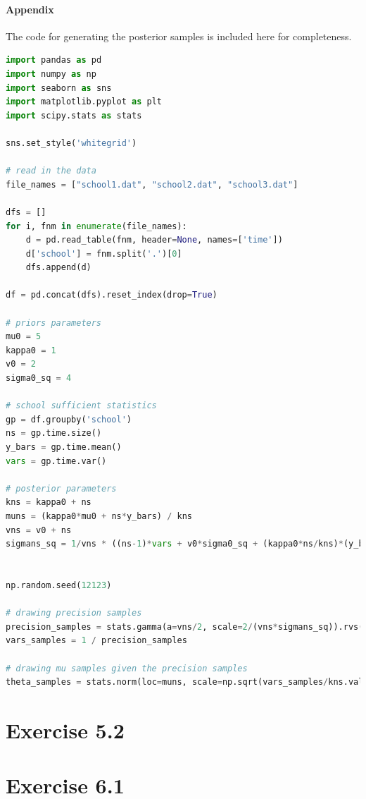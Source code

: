 \documentclass[11pt, letterpaper]{article}
\begin{document}
\paragraph{Appendix}
The code for generating the posterior samples is included here for completeness.
\begin{lstlisting}[language=Python]
import pandas as pd
import numpy as np
import seaborn as sns
import matplotlib.pyplot as plt
import scipy.stats as stats

sns.set_style('whitegrid')

# read in the data
file_names = ["school1.dat", "school2.dat", "school3.dat"]

dfs = []
for i, fnm in enumerate(file_names):
    d = pd.read_table(fnm, header=None, names=['time'])
    d['school'] = fnm.split('.')[0]
    dfs.append(d)

df = pd.concat(dfs).reset_index(drop=True)

# priors parameters
mu0 = 5
kappa0 = 1
v0 = 2
sigma0_sq = 4

# school sufficient statistics
gp = df.groupby('school')
ns = gp.time.size()
y_bars = gp.time.mean()
vars = gp.time.var()

# posterior parameters
kns = kappa0 + ns
muns = (kappa0*mu0 + ns*y_bars) / kns
vns = v0 + ns
sigmans_sq = 1/vns * ((ns-1)*vars + v0*sigma0_sq + (kappa0*ns/kns)*(y_bars-mu0)**2)


np.random.seed(12123)

# drawing precision samples
precision_samples = stats.gamma(a=vns/2, scale=2/(vns*sigmans_sq)).rvs(size=(100000, 3))
vars_samples = 1 / precision_samples

# drawing mu samples given the precision samples
theta_samples = stats.norm(loc=muns, scale=np.sqrt(vars_samples/kns.values)).rvs()
\end{lstlisting}


\section{Exercise 5.2}



\section{Exercise 6.1}
\end{document}
